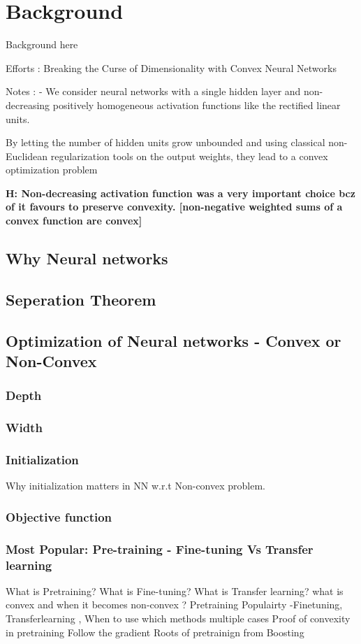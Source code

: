 \chapter{Background}
Background here



Efforts :
Breaking the Curse of Dimensionality with Convex Neural Networks

Notes : - 
We consider neural networks with a single hidden layer and non-decreasing positively homogeneous activation functions like the rectified linear units.

By letting the number of
hidden units grow unbounded and using classical non-Euclidean regularization tools on
the output weights, they lead to a convex optimization problem


\textbf{H: Non-decreasing activation function was a very important choice bcz of it favours to preserve convexity. [non-negative weighted sums of a convex function are convex]}





\section{Why Neural networks}

\section{Seperation Theorem}

\section{Optimization of Neural networks - Convex or Non-Convex}

\subsection{Depth}

\subsection{Width}

\subsection{Initialization}
Why initialization matters in NN w.r.t  Non-convex problem. 
\subsection{Objective function}
\subsection{Most Popular: Pre-training - Fine-tuning Vs Transfer learning}
What is Pretraining?
What is Fine-tuning?
What is Transfer learning?
what is convex and when it becomes non-convex ?
Pretraining Populairty
-Finetuning, Transferlearning , 
When to use which methods multiple cases
Proof of convexity in pretraining
Follow the gradient
Roots of pretrainign from Boosting 



